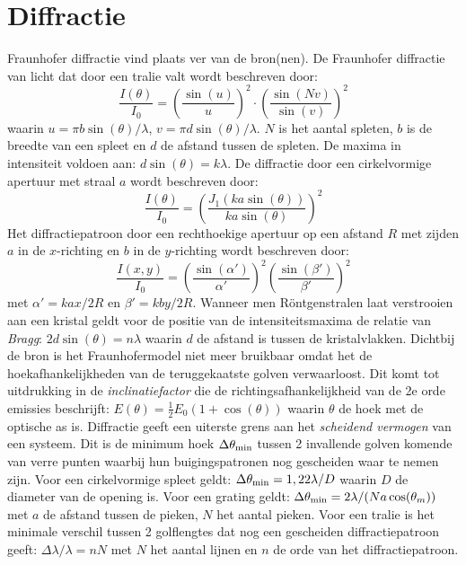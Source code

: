 \section{Diffractie}
Fraunhofer diffractie vind plaats ver van de bron(nen). De Fraunhofer
diffractie van licht dat door een tralie valt wordt beschreven door:
\[
\frac{I(\theta)}{I_0}=\left(\frac{\sin(u)}{u}\right)^2\cdot
\left(\frac{\sin(Nv)}{\sin(v)}\right)^2
\]
waarin $u=\pi b\sin(\theta)/\lambda$, $v=\pi d\sin(\theta)/\lambda$. $N$ is
het aantal spleten, $b$ is de breedte van een spleet en $d$ de afstand tussen
de spleten. De maxima in intensiteit voldoen aan: $d\sin(\theta)=k\lambda$.
\npar
De diffractie door een cirkelvormige apertuur met straal $a$ wordt beschreven
door:
\[
\frac{I(\theta)}{I_0}=\left(\frac{J_1(ka\sin(\theta))}{ka\sin(\theta)}\right)^2
\]
Het diffractiepatroon door een rechthoekige apertuur op een afstand $R$ met
zijden $a$ in de $x$-richting en $b$ in de $y$-richting wordt beschreven door:
\[
\frac{I(x,y)}{I_0}=\left(\frac{\sin(\alpha')}{\alpha'}\right)^2\left(\frac{\sin(\beta')}{\beta'}\right)^2
\]
met $\alpha'=kax/2R$ en $\beta'=kby/2R$.
\npar
Wanneer men R\"ontgenstralen laat verstrooien aan een kristal geldt
voor de positie van de intensiteitsmaxima de relatie van {\it Bragg}:
$2d\sin(\theta)=n\lambda$ waarin $d$ de afstand is tussen de kristalvlakken.
\npar
Dichtbij de bron is het Fraunhofermodel niet meer bruikbaar omdat het de
hoekafhankelijkheden van de teruggekaatste golven verwaarloost. Dit komt tot
uitdrukking in de {\it inclinatiefactor} die de richtingsafhankelijkheid van
de 2e orde emissies beschrijft: $E(\theta)=\frac{1}{2}E_0(1+\cos(\theta))$
waarin $\theta$ de hoek met de optische as is.
\npar
Diffractie geeft een uiterste grens aan het {\it scheidend vermogen} van een
systeem. Dit is de minimum hoek $\Delta\theta_{\rm min}$ tussen 2 invallende
golven komende van verre punten waarbij hun buigingspatronen nog gescheiden
waar te nemen zijn. Voor een cirkelvormige spleet geldt: $\Delta\theta_{\rm
min}=1,22\lambda/D$ waarin $D$ de diameter van de opening is.
\npar
Voor een grating geldt: $\Delta\theta_{\rm min}=2\lambda/(Na\cos(\theta_m))$
met $a$ de afstand tussen de pieken, $N$ het aantal pieken. Voor een tralie
is het minimale verschil tussen 2 golflengtes dat nog een gescheiden
diffractiepatroon geeft: $\Delta\lambda/\lambda=nN$ met $N$ het aantal lijnen
en $n$ de orde van het diffractiepatroon.


